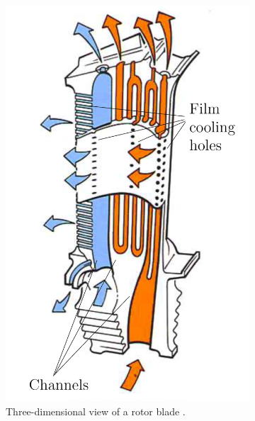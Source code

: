 \documentclass[a4paper, 11pt]{report}
\theoremstyle{definition}
\begin{document}
		\begin{figure}[H]
			\centering
			\begin{subfigure}{.49\textwidth}
				\centering
				\includegraphics[width=.8\textwidth]{../assets/rollsroyce/11.png}
				\caption{Three-dimensional view of a rotor blade \cite{Royce2015}.}
			\end{subfigure}
			\begin{subfigure}{.49\textwidth}
				\centering

\end{subfigure}
\end{figure}
\end{document}
